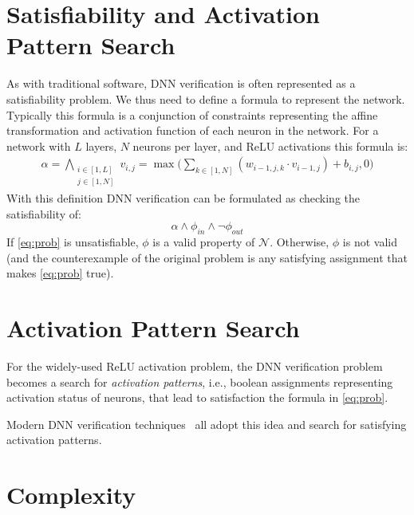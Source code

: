 \documentclass[oneside,11pt,dvipsnames]{book}
\begin{document}
\section{Satisfiability and Activation Pattern Search}\label{sec:satisfiability-and-activation-pattern-search}

 As with traditional software, DNN verification is often represented as a satisfiability problem.
We thus need to define a formula to represent the network. Typically this formula is a conjunction of constraints representing the affine transformation and activation function of each neuron in the network.
For a network with $L$ layers, $N$ neurons per layer, and ReLU activations this formula is:
\begin{align*}
\alpha = \bigwedge_{\begin{smallmatrix}i \in [1,L]\\ j \in [1,N]\end{smallmatrix}} v_{i,j} = \max \Big( \sum_{k \in [1,N]} (w_{i-1,j,k} \cdot v_{i-1,j}) + b_{i,j}, 0 \Big)
\end{align*}
With this definition DNN verification can be formulated as checking the satisfiability of:
\begin{equation}\label{eq:prob}
  \alpha \land \phi_{in} \land \neg \phi_{out}
\end{equation}
If \autoref{eq:prob} is unsatisfiable, $\phi$ is a valid property of $\mathcal{N}$. Otherwise, $\phi$ is not valid (and the counterexample of the original problem is any satisfying assignment that makes \autoref{eq:prob} true).


\section{Activation Pattern Search} For the widely-used ReLU activation problem, the DNN verification problem becomes a search for \emph{activation patterns}, i.e., boolean assignments representing activation status of neurons, that lead to satisfaction the formula in \autoref{eq:prob}. 

Modern DNN verification techniques~\cite{bunel2020branch,wang2021beta,ferrari2022complete,duong2024harnessing,duong2023dpllt,ovalbab,katz2019marabou,bak2021nnenum} all adopt this idea and search for satisfying activation patterns.


\section{Complexity}
\end{document}
